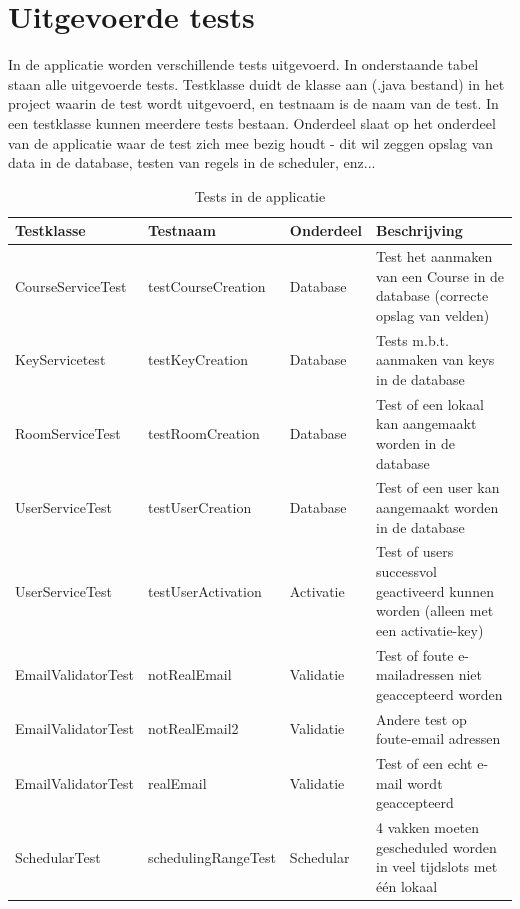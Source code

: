 \section{Uitgevoerde tests}
In de applicatie worden verschillende tests uitgevoerd. In onderstaande tabel staan alle uitgevoerde tests. Testklasse duidt de klasse aan (.java bestand) in het project waarin de test wordt uitgevoerd, en testnaam is de naam van de test. In een testklasse kunnen meerdere tests bestaan. Onderdeel slaat op het onderdeel van de applicatie waar de test   zich mee bezig houdt - dit wil zeggen opslag van data in de database, testen van regels in de scheduler, enz...

\begin{table}[htbp]
	\centering
	\caption{Tests in de applicatie}
	\begin{tabularx}{\textwidth}{|X|X|X|X|}
	    \hline
		\textbf{Testklasse} & \textbf{Testnaam} & \textbf{Onderdeel} & \textbf{Beschrijving} \\ \hline
		CourseServiceTest	& testCourseCreation & Database & Test het aanmaken van een Course in de database (correcte opslag van velden) \\ \hline
		KeyServicetest & testKeyCreation & Database & Tests m.b.t. aanmaken van keys in de database \\ \hline
		RoomServiceTest & testRoomCreation & Database & Test of een lokaal kan aangemaakt worden in de database \\ \hline
		UserServiceTest & testUserCreation & Database & Test of een user kan aangemaakt worden in de database \\ \hline
		UserServiceTest & testUserActivation & Activatie & Test of users successvol geactiveerd kunnen worden (alleen met een activatie-key) \\ \hline
		EmailValidatorTest & notRealEmail & Validatie & Test of foute e-mailadressen niet geaccepteerd worden \\ \hline
		EmailValidatorTest & notRealEmail2 & Validatie & Andere test op foute-email adressen \\ \hline
		EmailValidatorTest & realEmail & Validatie & Test of een echt e-mail wordt geaccepteerd \\ \hline
		SchedularTest & schedulingRangeTest & Schedular & 4 vakken moeten gescheduled worden in veel tijdslots met één lokaal \\ \hline
		
	\end{tabularx}
\end{table}

